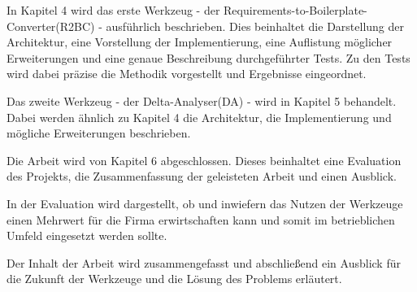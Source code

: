 \documentclass[12pt]{report}
\begin{document}
In Kapitel 4 wird das erste Werkzeug - der Requirements-to-Boilerplate-Converter(R2BC) - ausführlich beschrieben. Dies beinhaltet die Darstellung der Architektur, eine Vorstellung der Implementierung, eine Auflistung möglicher Erweiterungen und eine genaue Beschreibung durchgeführter Tests. Zu den Tests wird dabei präzise die Methodik vorgestellt und Ergebnisse eingeordnet. 

Das zweite Werkzeug - der Delta-Analyser(DA) - wird in Kapitel 5 behandelt. Dabei werden ähnlich zu Kapitel 4 die Architektur, die Implementierung und mögliche Erweiterungen beschrieben. 

Die Arbeit wird von Kapitel 6 abgeschlossen. Dieses beinhaltet eine Evaluation des Projekts, die Zusammenfassung der geleisteten Arbeit und einen Ausblick. 

In der Evaluation wird dargestellt, ob und inwiefern das Nutzen der Werkzeuge einen Mehrwert für die Firma erwirtschaften kann und somit im betrieblichen Umfeld eingesetzt werden sollte. 

Der Inhalt der Arbeit wird zusammengefasst und abschließend ein Ausblick für die Zukunft der Werkzeuge und die Lösung des Problems erläutert. 
\end{document}
